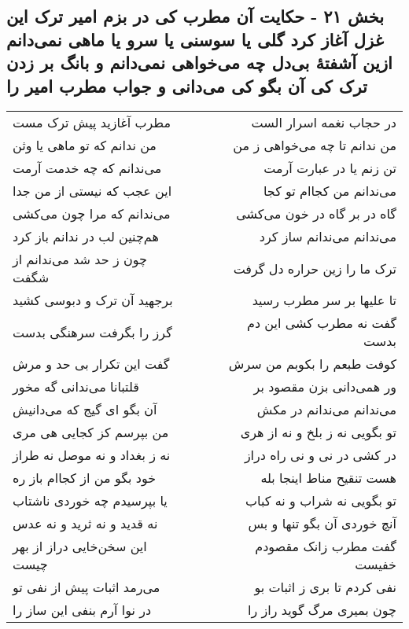 \begin{center}
\section*{بخش ۲۱ - حکایت آن مطرب کی در بزم امیر ترک این غزل آغاز کرد گلی یا سوسنی یا سرو یا ماهی نمی‌دانم ازین آشفتهٔ بی‌دل چه می‌خواهی نمی‌دانم  و بانگ بر زدن ترک کی آن بگو کی می‌دانی و جواب مطرب امیر را}
\label{sec:sh021}
\begin{longtable}{l p{0.5cm} r}
مطرب آغازید پیش ترک مست
&&
در حجاب نغمه اسرار الست
\\
من ندانم که تو ماهی یا وثن
&&
من ندانم تا چه می‌خواهی ز من
\\
می‌ندانم که چه خدمت آرمت
&&
تن زنم یا در عبارت آرمت
\\
این عجب که نیستی از من جدا
&&
می‌ندانم من کجاام تو کجا
\\
می‌ندانم که مرا چون می‌کشی
&&
گاه در بر گاه در خون می‌کشی
\\
هم‌چنین لب در ندانم باز کرد
&&
می‌ندانم می‌ندانم ساز کرد
\\
چون ز حد شد می‌ندانم از شگفت
&&
ترک ما را زین حراره دل گرفت
\\
برجهید آن ترک و دبوسی کشید
&&
تا علیها بر سر مطرب رسید
\\
گرز را بگرفت سرهنگی بدست
&&
گفت نه مطرب کشی این دم بدست
\\
گفت این تکرار بی حد و مرش
&&
کوفت طبعم را بکوبم من سرش
\\
قلتبانا می‌ندانی گه مخور
&&
ور همی‌دانی بزن مقصود بر
\\
آن بگو ای گیج که می‌دانیش
&&
می‌ندانم می‌ندانم در مکش
\\
من بپرسم کز کجایی هی مری
&&
تو بگویی نه ز بلخ و نه از هری
\\
نه ز بغداد و نه موصل نه طراز
&&
در کشی در نی و نی راه دراز
\\
خود بگو من از کجاام باز ره
&&
هست تنقیح مناط اینجا بله
\\
یا بپرسیدم چه خوردی ناشتاب
&&
تو بگویی نه شراب و نه کباب
\\
نه قدید و نه ثرید و نه عدس
&&
آنچ خوردی آن بگو تنها و بس
\\
این سخن‌خایی دراز از بهر چیست
&&
گفت مطرب زانک مقصودم خفیست
\\
می‌رمد اثبات پیش از نفی تو
&&
نفی کردم تا بری ز اثبات بو
\\
در نوا آرم بنفی این ساز را
&&
چون بمیری مرگ گوید راز را
\\
\end{longtable}
\end{center}

